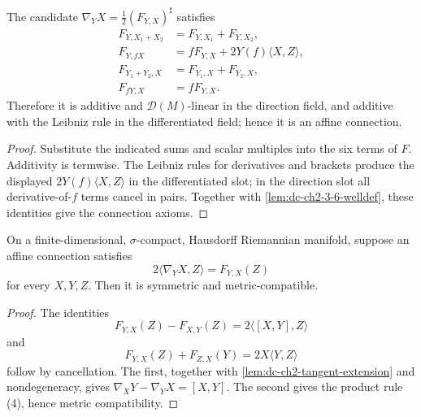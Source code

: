 \begin{lemma}
  \label{lem:dc-ch2-3-6-affine}


  The candidate $\nabla_YX=\frac12(F_{Y,X})^\sharp$ satisfies
  \begin{align*}
    F_{Y,X_1+X_2}&=F_{Y,X_1}+F_{Y,X_2},\\
    F_{Y,fX}&=fF_{Y,X}+2Y(f)\langle X,Z\rangle,\\
    F_{Y_1+Y_2,X}&=F_{Y_1,X}+F_{Y_2,X},\\
    F_{fY,X}&=fF_{Y,X}.
  \end{align*}
  Therefore it is additive and $\mathcal{D}(M)$-linear in the direction field,
  and additive with the Leibniz rule in the differentiated field; hence it is an
  affine connection.
\end{lemma}
\begin{proof}

  \sketch
  Substitute the indicated sums and scalar multiples into the six terms of
  $F$. Additivity is termwise. The Leibniz rules for derivatives and brackets
  produce the displayed $2Y(f)\langle X,Z\rangle$ in the differentiated slot;
  in the direction slot all derivative-of-$f$ terms cancel in pairs. Together
  with \cref{lem:dc-ch2-3-6-welldef}, these identities give the connection
  axioms.
\end{proof}

\begin{lemma}
  \label{lem:dc-ch2-3-6-exist}


  On a finite-dimensional, $\sigma$-compact, Hausdorff Riemannian manifold,
  suppose an affine connection satisfies
  \[
    2\langle\nabla_YX,Z\rangle=F_{Y,X}(Z)
  \]
  for every $X,Y,Z$. Then it is symmetric and metric-compatible.
\end{lemma}
\begin{proof}

  \sketch
  The identities
  \[
    F_{Y,X}(Z)-F_{X,Y}(Z)=2\langle[X,Y],Z\rangle
  \]
  and
  \[
    F_{Y,X}(Z)+F_{Z,X}(Y)=2X\langle Y,Z\rangle
  \]
  follow by cancellation. The first, together with
  \cref{lem:dc-ch2-tangent-extension} and nondegeneracy, gives
  $\nabla_XY-\nabla_YX=[X,Y]$. The second gives the product rule (4), hence
  metric compatibility.
\end{proof}

